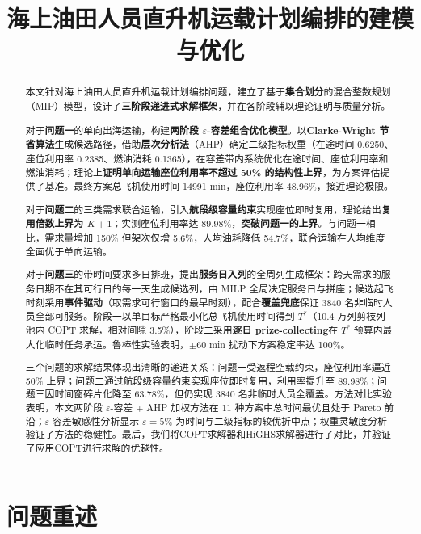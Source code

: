 \documentclass[withoutpreface]{cumcmthesis}
\title{海上油田人员直升机运载计划编排的建模与优化}
\begin{document}
\maketitle

\begin{abstract}
本文针对海上油田人员直升机运载计划编排问题，建立了基于\textbf{集合划分}的混合整数规划（MIP）模型，设计了\textbf{三阶段递进式求解框架}，并在各阶段辅以理论证明与质量分析。

对于\textbf{问题一}的单向出海运输，构建\textbf{两阶段 $\varepsilon$-容差组合优化模型}。以\textbf{Clarke-Wright 节省算法}生成候选路径，借助\textbf{层次分析法}（AHP）确定二级指标权重（在途时间 0.6250、座位利用率 0.2385、燃油消耗 0.1365），在容差带内系统优化在途时间、座位利用率和燃油消耗；理论上\textbf{证明单向运输座位利用率不超过 50\% 的结构性上界}，为方案评估提供了基准。最终方案总飞机使用时间 14991 min，座位利用率 48.96\%，接近理论极限。

对于\textbf{问题二}的三类需求联合运输，引入\textbf{航段级容量约束}实现座位即时复用，理论给出\textbf{复用倍数上界为 $K+1$}；实测座位利用率达 89.98\%，\textbf{突破问题一的上界}。与问题一相比，需求量增加 150\% 但架次仅增 5.6\%，人均油耗降低 54.7\%，联合运输在人均维度全面优于单向运输。

对于\textbf{问题三}的带时间要求多日排班，提出\textbf{服务日入列}的全周列生成框架：跨天需求的服务日期不在其可行日的每一天生成候选列，由 MILP 全局决定服务日与拼座；候选起飞时刻采用\textbf{事件驱动}（取需求可行窗口的最早时刻），配合\textbf{覆盖兜底}保证 3840 名非临时人员全部可服务。阶段一以单目标严格最小化总飞机使用时间得到 $T^*$（10.4 万列剪枝列池内 COPT 求解，相对间隙 3.5\%），阶段二采用\textbf{逐日 prize-collecting}在 $T^*$ 预算内最大化临时任务承运。鲁棒性实验表明，$\pm$60 min 扰动下方案稳定率达 100\%。

三个问题的求解结果体现出清晰的递进关系：问题一受返程空载约束，座位利用率逼近 50\% 上界；问题二通过航段级容量约束实现座位即时复用，利用率提升至 89.98\%；问题三因时间窗碎片化降至 63.78\%，但仍实现 3840 名非临时人员全覆盖。方法对比实验表明，本文两阶段 $\varepsilon$-容差 + AHP 加权方法在 11 种方案中总时间最优且处于 Pareto 前沿；$\varepsilon$-容差敏感性分析显示 $\varepsilon = 5\%$ 为时间与二级指标的较优折中点；权重灵敏度分析验证了方法的稳健性。最后，我们将COPT求解器和HiGHS求解器进行了对比，并验证了应用COPT进行求解的优越性。 
\end{abstract}

\section{问题重述}
\end{document}
